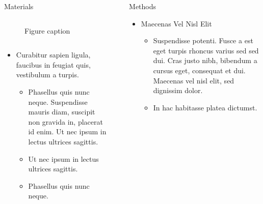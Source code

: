 \documentclass[final,hyperref={pdfpagelabels=false}]{beamer}
\begin{document}
\begin{frame}[t]
\begin{columns}[t]
\begin{column}{.32\textwidth}
\begin{block}{Materials}
\begin{columns}
\begin{column}{.43\textwidth} %
  \centering
  \begin{figure}
    \caption{Figure caption}
  \end{figure}
\end{column}
\end{columns} %

\begin{itemize}
\item Curabitur sapien ligula, faucibus in feugiat quis, vestibulum a
  turpis.
  \begin{itemize}
  \item Phasellus quis nunc neque. Suspendisse mauris diam, suscipit
    non gravida in, placerat id enim. Ut nec ipsum in lectus ultrices
    sagittis.
  \item Ut nec ipsum in lectus ultrices sagittis.
  \item Phasellus quis nunc neque.
  \end{itemize}
\end{itemize}

\end{block}

\end{column}
\begin{column}{.01\textwidth}\end{column} %
\begin{column}{.32\textwidth} %



  \begin{block}{Methods}

    \begin{itemize}
    \item Maecenas Vel Nisl Elit
      \begin{itemize}
      \item Suspendisse potenti. Fusce a est eget turpis rhoncus
        varius sed sed dui. Cras justo nibh, bibendum a cursus eget,
        consequat et dui. Maecenas vel nisl elit, sed dignissim dolor.
      \item In hac habitasse platea dictumst.
      \end{itemize}



\end{itemize}
\end{block}
\end{column}
\end{columns}
\end{frame}
\end{document}
